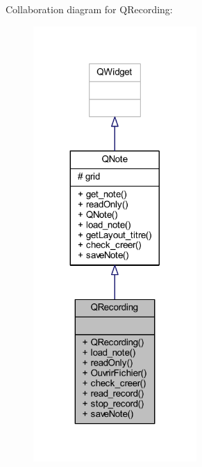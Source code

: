 Collaboration diagram for Q\+Recording\+:\nopagebreak
\begin{figure}[H]
\begin{center}
\leavevmode
\includegraphics[width=176pt]{class_q_recording__coll__graph}
\end{center}
\end{figure}
